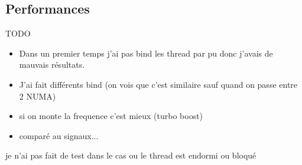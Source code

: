 
\subsection{Performances}
\label{sec:performance}

TODO

\begin{itemize}
  \item Dans un premier temps j'ai pas bind les thread par pu donc j'avais de mauvais résultats.
  \item J'ai fait différents bind (on vois que c'est similaire sauf quand on passe entre 2 NUMA)
  \item si on monte la frequence c'est mieux (turbo boost)
  \item comparé au signaux...
\end{itemize}

je n'ai pas fait de test dans le cas ou le thread est endormi ou bloqué
